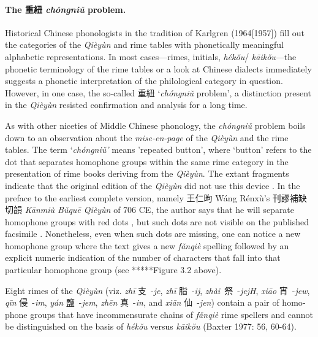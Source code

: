 \paragraph{The 重紐 \emph{chóngniǔ} problem.} Historical Chinese phonologists in the tradition of Karlgren
(1964{[}1957]) fill out the categories of the  \emph{Qièyùn} and rime
tables with phonetically meaningful alphabetic representations. In most
cases---rimes, initials,  \emph{hékŏu}/ \emph{kāikŏu}---the phonetic
terminology of the rime tables or a look at Chinese dialects immediately
suggests a phonetic interpretation of the philological category in
question. However, in one case, the so-called 重紐 `\emph{chóngniǔ}
problem', a distinction present in the  \emph{Qièyùn} resisted
confirmation and analysis for a long time.

As with other niceties of Middle Chinese phonology, the  \emph{chóngniǔ}
problem boils down to an observation about the  \emph{mise-en-page} of
the  \emph{Qièyùn} and the rime tables. The term `\emph{chóngniǔ'} means
'repeated button', where `button' refers to the dot that separates
homophone groups within the same rime category in the presentation of
rime books deriving from the  \emph{Qièyùn}. The extant fragments
indicate that the original edition of the  \emph{Qièyùn} did not use this
device 
\citep[36]{Bottero2013}. In the preface to the earliest complete
version, namely 王仁昫 Wáng Rénxù's 刊謬補缺切韻 \emph{Kānmiù Bǔquē
Qièyùn} of 706 CE, the author says that he will separate homophone
groups with red dots 
\citep[41]{Bottero2013}, but such dots are not visible
on the published facsimile 
\citep[434-527]{Zhou1983}. Nonetheless, even when
such dots are missing, one can notice a new homophone group where the
text gives a new  \emph{fǎnqiè} spelling followed by an explicit numeric
indication of the number of characters that fall into that particular
homo­phone group (see *****Figure 3.2 above).

Eight rimes of the \emph{Qièyùn} (viz. \emph{zhī} 支~-\emph{je},
 \emph{zhī} 脂~-\emph{ij},  \emph{zhài~}祭~-\emph{jejH},  \emph{xiāo}
宵~-\emph{jew},  \emph{qīn} 侵~-\emph{im},  \emph{yán} 鹽~-\emph{jem},
 \emph{zhēn} 真~-\emph{in}, and \emph{xiān} 仙~-\emph{jen}) contain a
pair of homo­phone groups that have in­com­men­surate chains of
 \emph{fǎnqiè} rime spellers and cannot be distinguished on the basis of
 \emph{hékŏu }versus \emph{kāikŏu} (Baxter 1977: 56, 60-64).

